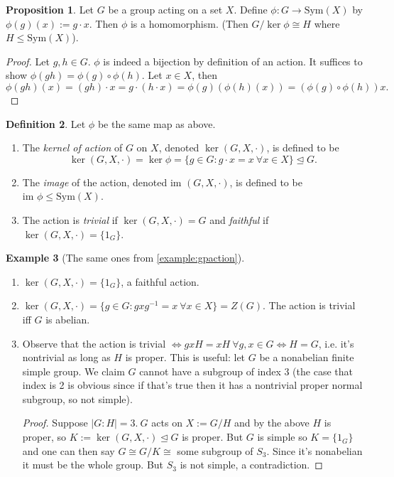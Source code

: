 \documentclass[a4paper]{article}
\newcommand{\Sym}{\text{Sym}}
\newcommand{\im}{\text{im }}
\theoremstyle{definition}
\newtheorem{defn}{Definition}[subsection]
\newtheorem{prop}[defn]{Proposition}
\newtheorem{example}[defn]{Example}
\begin{document}
\begin{prop}
\label{prop:GhomSymX}
Let $G$ be a group acting on a set $X$. Define $\phi:G\rightarrow\Sym(X)$ by $\phi(g)(x):=g\cdot x$. Then $\phi$ is a homomorphism. (Then $G/\ker\phi\cong H$ where $H\leq \Sym(X)$).
\end{prop}
\begin{proof}
Let $g,h\in G$. $\phi$ is indeed a bijection by definition of an action. It suffices to show $\phi(gh)=\phi(g)\circ\phi(h)$. Let $x\in X$, then
\[
\phi(gh)(x)=(gh)\cdot x = g\cdot(h\cdot x)=\phi(g)(\phi(h)(x))=(\phi(g)\circ\phi(h))x.
\]
\end{proof}

\begin{defn}
Let $\phi$ be the same map as above.
\begin{enumerate}
\item The \textit{kernel of action} of $G$ on $X$, denoted $\ker(G,X,\cdot)$, is defined to be
\[
\ker(G,X,\cdot)=\ker\phi=\{g\in G:g\cdot x=x \ \forall x\in X\} \unlhd G.
\]
\item The \textit{image} of the action, denoted $\im(G,X,\cdot)$, is defined to be $\im\phi\leq\Sym(X)$.
\item The action is \textit{trivial} if $\ker(G,X,\cdot)=G$ and \textit{faithful} if $\ker(G,X,\cdot)=\{1_G\}$.
\end{enumerate}
\end{defn}

\begin{example}[The same ones from \ref{example:gpaction}]
\begin{enumerate}
\item $\ker(G,X,\cdot)=\{1_G\}$, a faithful action.
\item $\ker(G,X,\cdot)=\{g\in G:gxg^{-1}=x \ \forall x\in X\}=Z(G)$. The action is trivial iff $G$ is abelian.
\item Observe that the action is trivial $\Leftrightarrow gxH=xH \ \forall g,x\in G\Leftrightarrow H=G$, i.e. it's nontrivial as long as $H$ is proper. This is useful: let $G$ be a nonabelian finite simple group. We claim $G$ cannot have a subgroup of index 3 (the case that index is 2 is obvious since if that's true then it has a nontrivial proper normal subgroup, so not simple).
\begin{proof}
Suppose $|G:H|=3.\ G$ acts on $X:=G/H$ and by the above $H$ is proper, so $K:=\ker(G,X,\cdot) \unlhd G$ is proper. But $G$ is simple so $K=\{1_G\}$ and one can then say $G\cong G/K\cong$ some subgroup of $S_3$. Since it's nonabelian it must be the whole group. But $S_3$ is not simple, a contradiction. 
\end{proof}
\end{enumerate}
\end{example}
\end{document}
